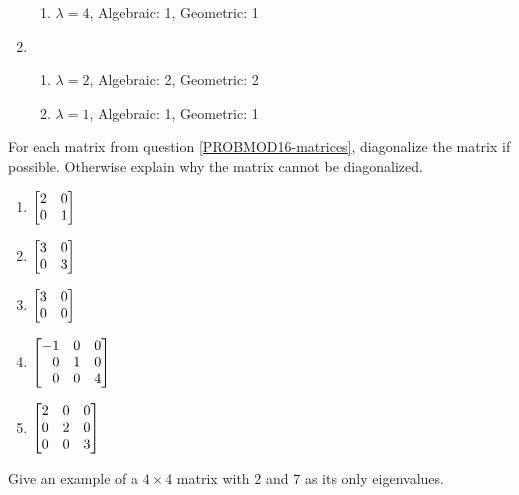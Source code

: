 \begin{exercises}
\begin{problist}
\begin{solution}
\begin{enumerate}
\begin{enumerate}
		                \item $\lambda=4$, Algebraic: 1, Geometric: 1 
		            \end{enumerate}
		        \item 
		            \begin{enumerate}
		                \item $\lambda=2$, Algebraic: 2, Geometric: 2 
		                \item $\lambda=1$, Algebraic: 1, Geometric: 1 
		            \end{enumerate}
		    \end{enumerate}
		\end{solution}
		\prob For each matrix from question \ref{PROBMOD16-matrices}, diagonalize the matrix if
		possible. Otherwise explain why the matrix cannot be diagonalized.
        \begin{solution}
            \begin{enumerate}
                \item $\mat{2&0\\0&1}$
                \item $\mat{3&0\\0&3}$
                \item $\mat{3&0\\0&0}$
                \item $\mat{-1&0&0\\0&1&0\\0&0&4}$
                \item $\mat{2&0&0\\0&2&0\\0&0&3}$
            \end{enumerate}
        \end{solution}
		\prob Give an example of a $4\times 4$ matrix with $2$ and $7$ as its only eigenvalues.


\end{problist}
\end{exercises}
